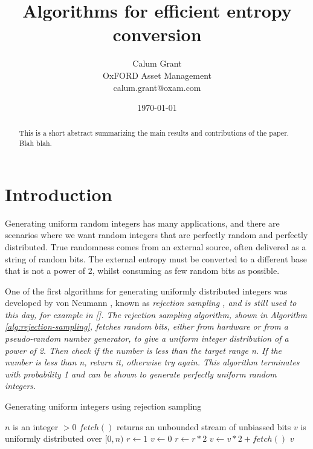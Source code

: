 \documentclass[12pt]{article}
\title{Algorithms for efficient entropy conversion}
\author{Calum Grant \\
OxFORD Asset Management \\
calum.grant@oxam.com}
\date{\today}
\begin{document}
\maketitle

\begin{abstract}
This is a short abstract summarizing the main results and contributions of the paper. Blah blah.
\end{abstract}

\section{Introduction}

Generating uniform random integers has many applications, and there are scenarios where we want random integers that are perfectly random and perfectly distributed. True randomness comes from an external source, often delivered as a string of random bits. The external entropy must be converted to a different base that is not a power of 2, whilst consuming as few random bits as possible.

One of the first algorithms for generating uniformly distributed integers was developed by von Neumann \cite{neumann}, known as \em rejection sampling \em, and is still used to this day, for example in []. The rejection sampling algorithm, shown in Algorithm \ref{alg:rejection-sampling}, fetches random bits, either from hardware or from a pseudo-random number generator, to give a uniform integer distribution of a power of 2. Then check if the number is less than the target range n. If the number is less than n, return it, otherwise try again. This algorithm terminates with probability 1 and can be shown to generate perfectly uniform random integers.

\begin{algorithm}
\caption{Generating uniform integers using rejection sampling}
    \label{alg:rejection-sampling}
\begin{algorithmic}[1]
    \Require $n$ is an integer $>0$
    \Require $fetch()$ returns an unbounded stream of unbiassed bits
    \Ensure $v$ is uniformly distributed over $[0,n)$
        \State $r \gets 1$
        \State $v \gets 0$
            \State $r \gets r * 2$
            \State $v \gets v * 2 + fetch()$
        \EndWhile
            \State \Return $v$
        \EndIf
    \EndWhile
\EndProcedure
\end{algorithmic}
\end{algorithm}
\end{document}
